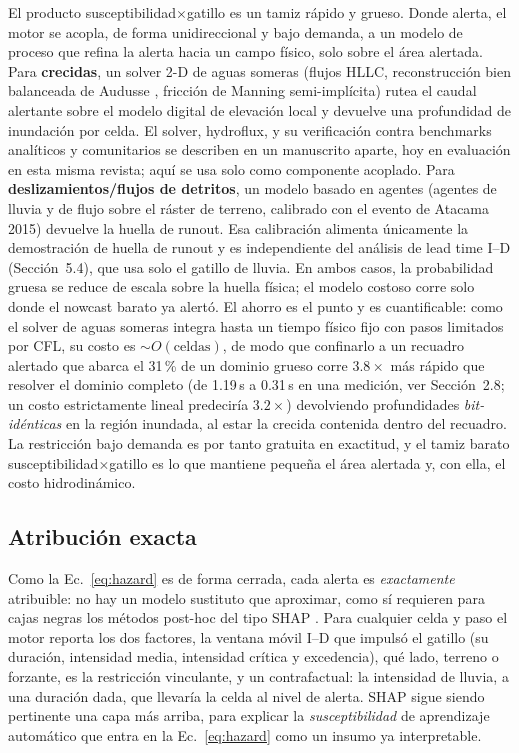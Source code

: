 \documentclass[authoryear,preprint,review,12pt]{elsarticle}
\begin{document}
El producto susceptibilidad$\times$gatillo es un tamiz rápido y grueso. Donde
alerta, el motor se acopla, de forma unidireccional y bajo demanda, a un modelo de
proceso que refina la alerta hacia un campo físico, solo sobre el área alertada.
Para \textbf{crecidas}, un solver 2-D de aguas someras (flujos HLLC,
reconstrucción bien balanceada de Audusse \citep{audusse2004}, fricción de Manning
semi-implícita) rutea el caudal alertante sobre el modelo digital de elevación
local y devuelve una profundidad de inundación por celda. El solver, hydroflux, y su verificación contra benchmarks analíticos y comunitarios se describen en un manuscrito aparte, hoy en evaluación en esta misma revista; aquí se usa solo como componente acoplado. Para \textbf{deslizamientos/flujos de detritos}, un modelo basado en agentes (agentes
de lluvia y de flujo sobre el ráster de terreno, calibrado con el evento de
Atacama 2015) devuelve la huella de runout. Esa calibración alimenta únicamente la
demostración de huella de runout y es independiente del análisis de lead time I--D
(Sección~5.4), que usa solo el gatillo de lluvia. En ambos casos, la probabilidad
gruesa se reduce de escala sobre la huella física; el modelo costoso corre solo
donde el nowcast barato ya alertó. El ahorro es el punto y es cuantificable: como
el solver de aguas someras integra hasta un tiempo físico fijo con pasos limitados
por CFL, su costo es ${\sim}O(\mathrm{celdas})$, de modo que confinarlo a un
recuadro alertado que abarca el 31\,\% de un dominio grueso corre $3.8\times$ más
rápido que resolver el dominio completo (de 1.19\,s a 0.31\,s en una medición, ver Sección~2.8; un costo estrictamente lineal predeciría $3.2\times$) devolviendo
profundidades \emph{bit-idénticas} en la región inundada, al estar la crecida
contenida dentro del recuadro. La restricción bajo demanda es por tanto gratuita
en exactitud, y el tamiz barato susceptibilidad$\times$gatillo es lo que mantiene
pequeña el área alertada y, con ella, el costo hidrodinámico.

\subsection{Atribución exacta}

Como la Ec.~\eqref{eq:hazard} es de forma cerrada, cada alerta es
\emph{exactamente} atribuible: no hay un modelo sustituto que aproximar, como sí
requieren para cajas negras los métodos post-hoc del tipo SHAP
\citep{lundberg2017}. Para cualquier celda y paso el motor reporta los dos
factores, la ventana móvil I--D que impulsó el gatillo (su duración, intensidad
media, intensidad crítica y excedencia), qué lado, terreno o forzante, es la
restricción vinculante, y un contrafactual: la intensidad de lluvia, a una
duración dada, que llevaría la celda al nivel de alerta. SHAP sigue siendo
pertinente una capa más arriba, para explicar la \emph{susceptibilidad} de
aprendizaje automático que entra en la Ec.~\eqref{eq:hazard} como un insumo ya
interpretable.
\end{document}
